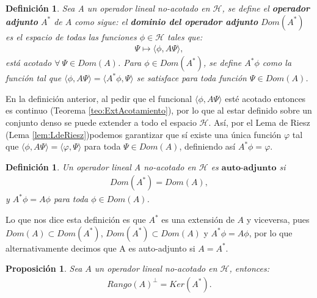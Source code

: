 \documentclass[12pt]{article}
\newtheorem{defn}[teo]{Definición}
\newtheorem{prop}[teo]{Proposición}
\theoremstyle{definition}
\begin{document}
\begin{defn}
    Sea A un operador lineal no-acotado en $\mathcal{H}$, se define el  \textbf{operador adjunto} $A^*$ de $A$ como sigue: el \textbf{dominio del operador adjunto} $Dom(A^{*})$ es el espacio de todas las funciones $\phi \in \mathcal{H}$ tales que:
    \begin{align*}
        \Psi \mapsto \langle\phi,A\Psi\rangle,
    \end{align*}
     está acotado $\forall\:\Psi\in Dom(A)$. Para $\phi \in Dom(A^{*})$, se define $A^{*}\phi$ como la función tal que $\langle\phi,A\Psi\rangle = \langle A^{*}\phi,\Psi\rangle$ se satisface para toda función $\Psi \in Dom(A)$.
    \label{def:DomAutoadjunto}
\end{defn}
\noindent
En la definición anterior, al pedir que el funcional $\langle\phi,A\Psi\rangle$ esté acotado entonces es continuo (Teorema \ref{teo:ExtAcotamiento}), por lo que al estar definido sobre un conjunto denso se puede extender a todo el espacio $\mathcal{H}$. Así, por el Lema de Riesz (Lema \ref{lem:LdeRiesz})podemos garantizar que sí existe una única función $\varphi$ tal que $\langle\phi,A\Psi\rangle = \langle\varphi,\Psi\rangle$ para toda $\Psi\in Dom(A)$, definiendo así $A^{*}\phi = \varphi$.
\begin{defn}
    Un operador lineal A no-acotado en  $\mathcal{H}$ es $\textbf{auto-adjunto}$ si
    \begin{align*}
        Dom(A^{*}) = Dom(A),
    \end{align*}
    y $A^{*}\phi = A\phi$ para toda $\phi \in Dom(A)$.
    \label{def:Autoadjunto}
\end{defn}
\noindent
  Lo que nos dice esta definición es que $A^{*}$ es una extensión de $A$ y viceversa, pues $Dom(A) \subset Dom(A^{*})$, $Dom(A^{*}) \subset Dom(A) $ y $A^{*}\phi = A\phi$, por lo que alternativamente decimos que A es auto-adjunto si $A = A^{*}$.
\begin{prop}
    Sea $A$ un operador lineal no-acotado en $\mathcal{H}$, entonces:
    \begin{align*}
        Rango(A)^{\perp} = Ker(A^{*}).
    \end{align*}
    \label{prop:Complementos}
\end{prop}
\end{document}
